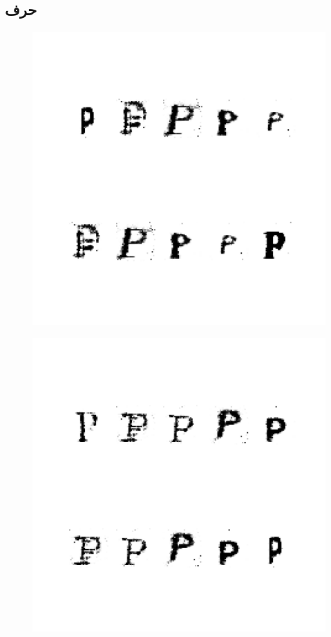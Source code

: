 \documentclass{article}
\begin{document}
\subsection{حرف }
\begin{figure}[H]
	\centerline{\includegraphics[width=\textwidth , height=\textheight ]{../results/CGAN_Adam/figs/letters/P/95.pdf}}
\end{figure}
\begin{figure}[H]
	\centerline{\includegraphics[width=\textwidth , height=\textheight ]{../results/CGAN_Adam/figs/letters/P/90.pdf}}
\end{figure}
\end{document}
